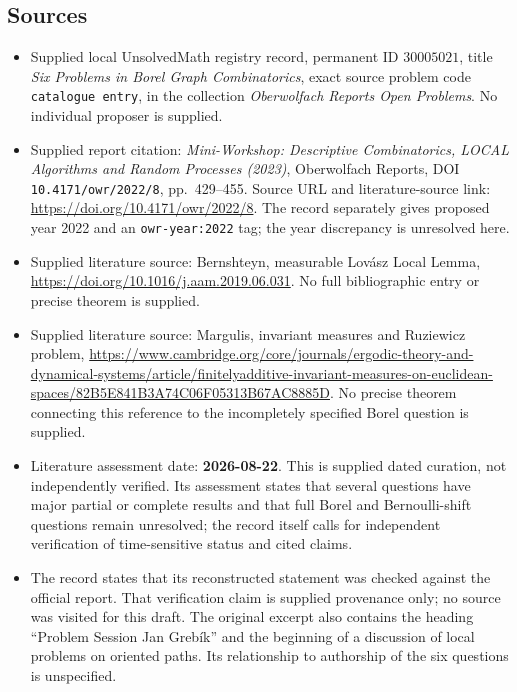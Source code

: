 \documentclass[11pt]{article}
\begin{document}
\subsection{Sources}
\begin{itemize}
\item Supplied local UnsolvedMath registry record, permanent ID \(30005021\), title \emph{Six Problems in Borel Graph Combinatorics}, exact source problem code \texttt{catalogue entry}, in the collection \emph{Oberwolfach Reports Open Problems}. No individual proposer is supplied.
\item Supplied report citation: \emph{Mini-Workshop: Descriptive Combinatorics, LOCAL Algorithms and Random Processes (2023)}, Oberwolfach Reports, DOI \texttt{10.4171/owr/2022/8}, pp.~429--455. Source URL and literature-source link: \url{https://doi.org/10.4171/owr/2022/8}. The record separately gives proposed year 2022 and an \texttt{owr-year:2022} tag; the year discrepancy is unresolved here.
\item Supplied literature source: Bernshteyn, measurable Lov\'asz Local Lemma, \url{https://doi.org/10.1016/j.aam.2019.06.031}. No full bibliographic entry or precise theorem is supplied.
\item Supplied literature source: Margulis, invariant measures and Ruziewicz problem, \url{https://www.cambridge.org/core/journals/ergodic-theory-and-dynamical-systems/article/finitelyadditive-invariant-measures-on-euclidean-spaces/82B5E841B3A74C06F05313B67AC8885D}. No precise theorem connecting this reference to the incompletely specified Borel question is supplied.
\item Literature assessment date: \textbf{2026-08-22}. This is supplied dated curation, not independently verified. Its assessment states that several questions have major partial or complete results and that full Borel and Bernoulli-shift questions remain unresolved; the record itself calls for independent verification of time-sensitive status and cited claims.
\item The record states that its reconstructed statement was checked against the official report. That verification claim is supplied provenance only; no source was visited for this draft. The original excerpt also contains the heading ``Problem Session Jan Greb\'ik'' and the beginning of a discussion of local problems on oriented paths. Its relationship to authorship of the six questions is unspecified.
\end{itemize}
\end{document}
